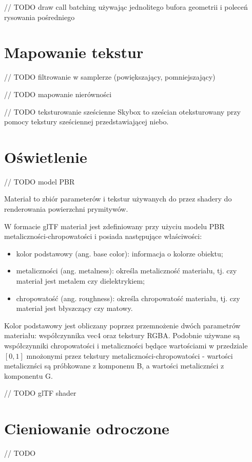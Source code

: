 // TODO draw call batching używając jednolitego bufora geometrii i poleceń rysowania pośredniego

\section{Mapowanie tekstur}

// TODO filtrowanie w samplerze (powiększający, pomniejszający)

// TODO mapowanie nierówności

// TODO teksturowanie sześcienne
Skybox to sześcian oteksturowany przy pomocy tekstury sześciennej przedstawiającej niebo.

\section{Oświetlenie}

// TODO model PBR

Materiał to zbiór parameterów i tekstur używanych do przez shadery do renderowania powierzchni prymitywów.

W formacie glTF materiał jest zdefiniowany przy użyciu modelu PBR metaliczności-chropowatości i posiada następujące właściwości:
\begin{itemize}
	\item kolor podstawowy (ang. base color): informacja o kolorze obiektu;
	\item metaliczności (ang. metalness): określa metaliczność materiału, tj. czy materiał jest metalem czy dielektrykiem;
	\item chropowatość (ang. roughness): określa chropowatość materiału, tj. czy materiał jest błyszczący czy matowy.
\end{itemize}

Kolor podstawowy jest obliczany poprzez przemnożenie dwóch parametrów materiału: współczynnika vec4 oraz tekstury RGBA.
Podobnie używane są współczynniki chropowatości i metaliczności będące wartościami w przedziale $\left[0,1\right]$ mnożonymi przez tekstury metaliczności-chropowatości - wartości metalicznści są próbkowane z komponenu B, a wartości metalicznści z komponentu G.

// TODO glTF shader

\section{Cieniowanie odroczone}

// TODO 

